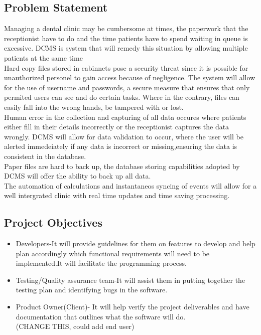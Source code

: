 \documentclass[11 pt]{article}
\begin{document}
\subsection{Problem Statement}
Managing a dental clinic may be cumbersome at times, the paperwork that the receptionist have to do and the time  patients have to spend waiting in queue is excessive. DCMS is system that will remedy this situation by allowing multiple patients at the same time\\
Hard copy files stored in cabinnets pose a security threat since it is possible for unauthorized personel to gain access because of negligence. The system will allow for the use of username and passwords, a secure measure that ensures that only permited users can see and do certain tasks. Where in the contrary, files can easily fall into the wrong hands, be tampered with or lost.\\
Human error in the collection and capturing of all data occures where patients either fill in their details incorrectly or the receptionist captures the data wrongly. DCMS will allow for data validation to occur, where the user will be alerted immedeiately if any data is incorrect or missing,ensuring the data is consistent in the database.\\
Paper files are hard to back up, the database storing capabilities adopted by DCMS will offer the ability to back up all data. \\
The automation of calculations and instantaneos syncing of events will allow for a well intergrated clinic with real time updates and time saving processing.
\subsection{Project Objectives }

 \begin{itemize}
\item
Developers-It will provide guidelines for them on features to develop and help plan accordingly which functional requirements will need to be implemented.It will facilitate the programming process.\\
\item
Testing/Quality assurance team-It will assist them in putting together the testing plan and identifying bugs in the software.\\
\item
Product Owner(Client)- It will help verify the project deliverables and have documentation that outlines what the software will do.\\(CHANGE THIS, could add end user)
\end{itemize}
\end{document}
